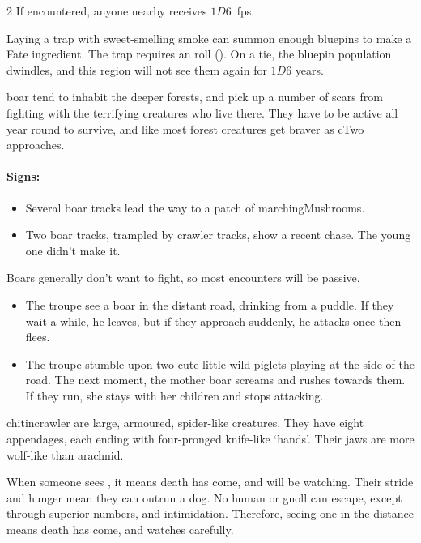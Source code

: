 \begin{multicols}{2}
If encountered, anyone nearby receives $1D6$~\glspl{fp}.

Laying a trap with sweet-smelling smoke can summon enough bluepins to make a Fate \gls{ingredient}.
The trap requires an  roll (\tn[12]).
On a tie, the bluepin population dwindles, and this \gls{region} will not see them again for $1D6$ years.

  {boar}%
tend to inhabit the deeper forests, and pick up a number of scars from fighting with the terrifying creatures who live there.
They have to be active all year round to survive, and like most forest creatures get braver as \gls{cTwo} approaches.

\boar


\paragraph{Signs:}
\begin{itemize}
  \item
  Several boar tracks lead the way to a patch of \glspl{marchingMushroom}.
  \item
  Two boar tracks, trampled by \gls{crawler} tracks, show a recent chase.
  The young one didn't make it.
\end{itemize}

\showEnc
Boars generally don't want to fight, so most encounters will be passive.

\begin{itemize}
  \item
  The troupe see a boar in the distant road, drinking from a puddle.
  If they wait a while, he leaves, but if they approach suddenly, he attacks once then flees.
  \item
  The troupe stumble upon two cute little wild piglets playing at the side of the road.
  The next moment, the mother boar screams and rushes towards them.
  If they run, she stays with her children and stops attacking.
\end{itemize}


  {chitincrawler}%
are large, armoured, spider-like creatures.
They have eight appendages, each ending with four-pronged knife-like `hands'.
Their jaws are more wolf-like than arachnid.

When someone sees , it means death has come, and will be watching.
Their stride and hunger mean they can outrun a dog.
No human or gnoll can escape, except through superior numbers, and intimidation.
Therefore, seeing one in the distance means death has come, and watches carefully.


\end{multicols}
